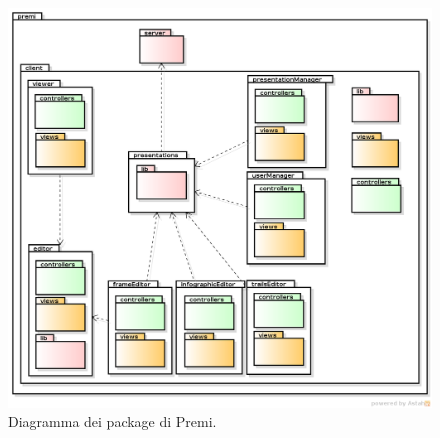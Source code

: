 \begin{figure}[h]
\begin{center}
\includegraphics[scale=0.40]{img/diapkg/package.png}
\caption{Diagramma dei package di Premi.}
\end{center}
\end{figure}

